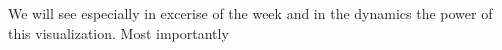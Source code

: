 We will see especially in excerise of the week and in the dynamics the power of this visualization. Most importantly